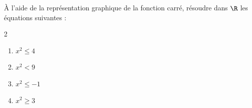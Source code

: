 \begin{exo}{}
	À l'aide de la représentation graphique de la fonction carré, résoudre dans $\R$ les équations suivantes :
	\vspace*{-2mm}
	\begin{multicols}{2}
	\begin{enumerate}[itemsep=2mm]
		\item $x^2 \le 4$
		\item $x^2 < 9$
		\item $x^2 \le -1$
		\item $x^2 \ge 3$
	\end{enumerate}
	\end{multicols}\vspace*{-2mm}
\end{exo}
